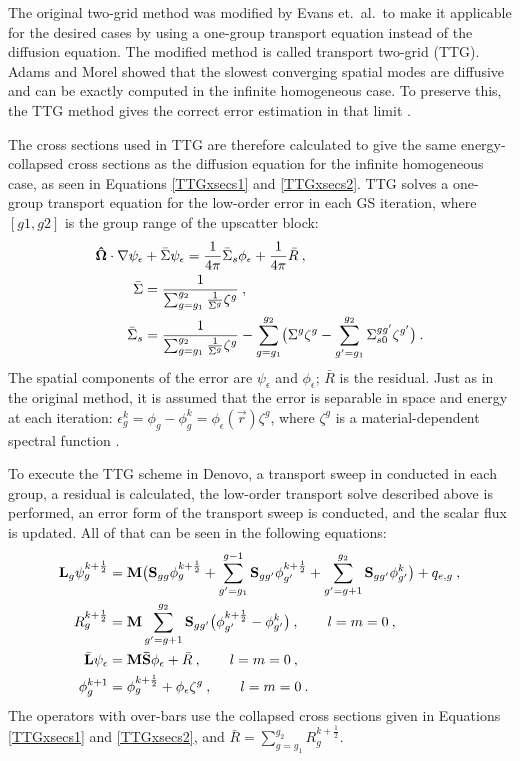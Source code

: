 The original two-grid method was modified by Evans et.\ al.\ to make it applicable for the desired cases by using a one-group transport equation instead of the diffusion equation. The modified method is called transport two-grid (TTG). Adams and Morel showed that the slowest converging spatial modes are diffusive and can be exactly computed in the infinite homogeneous case. To preserve this, the TTG method gives the correct error estimation in that limit \cite{Evans2009d}. 

The cross sections used in TTG are therefore calculated to give the same energy-collapsed cross sections as the diffusion equation for the infinite homogeneous case, as seen in Equations \eqref{TTGxsecs1} and \eqref{TTGxsecs2}. TTG solves a one-group transport equation for the low-order error in each GS iteration, where $[g1, g2]$ is the group range of the upscatter block:
%
\begin{align}
  \mathbf{\hat{\Omega}} \cdot \nabla \psi_{\epsilon} &+ \bar{\Sigma}\psi_{\epsilon} = \frac{1}{4\pi}\bar{\Sigma}_{s}\phi_{\epsilon} + \frac{1}{4\pi}\bar{R} \:, \\
  \bar{\Sigma} &= \frac{1}{\sum_{g=g_1}^{g_2} \frac{1}{\Sigma^g}\zeta^g} \label{TTGxsecs1} \:,\\
  \bar{\Sigma}_{s} &= \frac{1}{\sum_{g=g_1}^{g_2} \frac{1}{\Sigma^g}\zeta^g} - \sum_{g=g_1}^{g_2} \bigl(\Sigma^g\zeta^g - \sum_{g'=g_1}^{g_2} \Sigma_{s0}^{gg'} \zeta^{g'} \bigr) \label{TTGxsecs2} \:. 
\end{align}
%
The spatial components of the error are $\psi_{\epsilon}$ and $\phi_{\epsilon}$; $\bar{R}$ is the residual. Just as in the original method, it is assumed that the error is separable in space and energy at each iteration: $\epsilon_g^k = \phi_g - \phi_g^k = \phi_{\epsilon}(\vec{r})\zeta^g$, where $\zeta^g$ is a material-dependent spectral function \cite{Evans2009d}. 

To execute the TTG scheme in Denovo, a transport sweep in conducted in each group, a residual is calculated, the low-order transport solve described above is performed, an error form of the transport sweep is conducted, and the scalar flux is updated. All of that can be seen in the following equations: 
\begin{align}
  \mathbf{L}_g \psi_g^{k+\frac{1}{2}} &= \mathbf{M}\bigl(\mathbf{S}_{gg}\phi_g^{k+\frac{1}{2}} + \sum_{g'=g_1}^{g-1} \mathbf{S}_{gg'}\phi_{g'}^{k+\frac{1}{2}} + \sum_{g'=g+1}^{g_2}\mathbf{S}_{gg'}\phi_{g'}^k \bigr) + q_{e,g}  \:, \\
  R^{k+\frac{1}{2}}_g &= \mathbf{M} \sum_{g'=g+1}^{g_2}\mathbf{S}_{gg'} \bigl( \phi_{g'}^{k+\frac{1}{2}} - \phi_{g'}^k \bigr) \:, \qquad l = m = 0 \:, \\
  \bar{\mathbf{L}}\psi_{\epsilon} &= \mathbf{M\bar{S}} \phi_{\epsilon} + \bar{R} \:, \qquad l = m = 0 \:, \label{TTGerrorEqn} \\
  \phi_g^{k+1} &= \phi_{g}^{k+\frac{1}{2}} + \phi_{\epsilon}\zeta^g \:, \qquad l = m = 0 \:.
\end{align}
The operators with over-bars use the collapsed cross sections given in Equations \eqref{TTGxsecs1} and \eqref{TTGxsecs2}, and $\bar{R} = \sum_{g=g_1}^{g_2} R_g^{k+\frac{1}{2}}$. 

